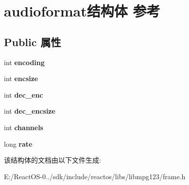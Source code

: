 \hypertarget{structaudioformat}{}\section{audioformat结构体 参考}
\label{structaudioformat}
\subsection*{Public 属性}
\begin{DoxyCompactItemize}
\item 
\mbox{\label{structaudioformat_a1fd200cd639df47b11e8e4a26be5c0dc}} 
int {\bfseries encoding}
\item 
\mbox{\label{structaudioformat_a66127bcc43b1411a211f6a995a842bcc}} 
int {\bfseries encsize}
\item 
\mbox{\label{structaudioformat_ab637731d8c1575b25f5bcbba286317c7}} 
int {\bfseries dec\+\_\+enc}
\item 
\mbox{\label{structaudioformat_ad1b4c4ceb04ce6a7f32fafaaa4fefbd9}} 
int {\bfseries dec\+\_\+encsize}
\item 
\mbox{\label{structaudioformat_a5645bb71bad11f9a9530de31ad89e614}} 
int {\bfseries channels}
\item 
\mbox{\label{structaudioformat_afcbd37793cf2a369acd90b411f0de2ed}} 
long {\bfseries rate}
\end{DoxyCompactItemize}


该结构体的文档由以下文件生成\+:\begin{DoxyCompactItemize}
\item 
E\+:/\+React\+O\+S-\/0../sdk/include/reactos/libs/libmpg123/frame.\+h\end{DoxyCompactItemize}
